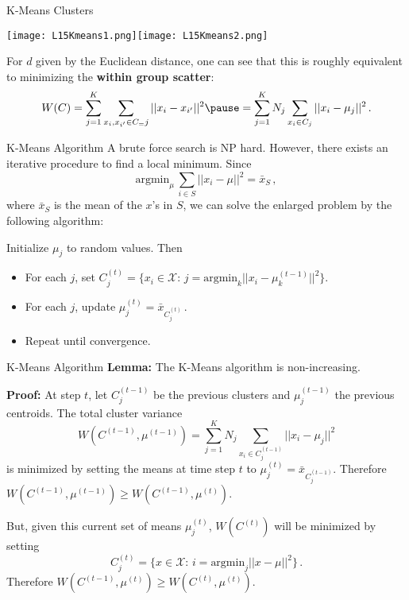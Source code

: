 \documentclass[10pt, table, dvipsnames,xcdraw,handout]{beamer}
\begin{document}
\begin{frame}[fragile]{K-Means Clusters}
  \begin{minipage}[t][0.5\textheight][t]{\textwidth}
	\centering \texttt{[image: L15Kmeans1.png]}\hspace{1em}\texttt{[image: L15Kmeans2.png]} 
  \end{minipage}
  \vfill
\begin{minipage}[t][0.5\textheight][t]{\textwidth}
For $d$ given by the Euclidean distance, one can see that this is roughly equivalent to minimizing the \textbf{within group scatter}:
$$
W(C) = \sum_{j=1}^K\sum_{x_i,x_{i'}\in C_=j} ||x_{i}-x_{i'}||^2 \pause = \sum_{j=1}^KN_j\sum_{x_i\in C_j} ||x_i - \mu_j||^2\,.
$$
\end{minipage}
\end{frame}



\begin{frame}[fragile]{K-Means Algorithm}
A brute force search is NP hard. However, there exists an iterative procedure to find a local minimum. \pause Since 
$$
\text{argmin}_\mu \,\sum_{i\in S}||x_i - \mu||^2 = \bar x_S\,,
$$
where $\bar{x}_S$ is the mean of the $x$'s in $S$, we can solve the enlarged problem by the following algorithm:\pause\newline

Initialize $\mu_j$ to random values. Then
\begin{itemize}
\item[] For each $j$, set $C_j^{(t)} = \{x_i\in \mathcal{X}:\, j = \text{argmin}_k ||x_i-\mu^{(t-1)}_k||^2\}$. \pause
\item[] For each $j$, update $\mu_j^{(t)} = \bar x_{C_j^{(t)}}$\,. \pause
\item[] Repeat until convergence. 
\end{itemize}
\end{frame}



\begin{frame}[fragile]{K-Means Algorithm}
\textbf{Lemma:} The K-Means algorithm is non-increasing.\newline\pause

\textbf{Proof:}
At step $t$, let $C^{(t-1)}_j$ be the previous clusters and $\mu_{j}^{(t-1)}$ the previous centroids. The total cluster variance
$$
W(C^{(t-1)},\mu^{(t-1)})  = \sum_{j=1}^KN_j\sum_{x_i\in C_j^{(t-1)}} ||x_i - \mu_j||^2
$$
is minimized by setting the means at time step $t$ to $\mu_j^{(t)} = \bar x_{C_j^{(t-1)}}$. Therefore $W(C^{(t-1)},\mu^{(t-1)}) \geq W(C^{(t-1)},\mu^{(t)})$.

\pause But, given this current set of means $\mu_j^{(t)}$, $W(C^{(t)})$ will be minimized by setting
$$
C_j^{(t)} = \{x\in \mathcal{X}:\, i = \text{argmin}_j ||x-\mu||^2\}\,.
$$
Therefore $W(C^{(t-1)},\mu^{(t)}) \geq W(C^{(t)},\mu^{(t)})$.

\end{frame}
\end{document}
